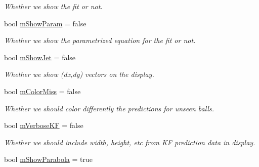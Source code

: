 \begin{DoxyCompactItemize}
\begin{DoxyCompactList}\small\item\em Whether we show the fit or not. \end{DoxyCompactList}\item 
bool \hyperlink{classProjectorWindow_a945d28c6ad25e7ef3b707a4a92c7359a}{m\+Show\+Param} = false\hypertarget{classProjectorWindow_a945d28c6ad25e7ef3b707a4a92c7359a}{}\label{classProjectorWindow_a945d28c6ad25e7ef3b707a4a92c7359a}

\begin{DoxyCompactList}\small\item\em Whether we show the parametrized equation for the fit or not. \end{DoxyCompactList}\item 
bool \hyperlink{classProjectorWindow_ada8648c5f69ce30da817aa2194912d95}{m\+Show\+Jet} = false\hypertarget{classProjectorWindow_ada8648c5f69ce30da817aa2194912d95}{}\label{classProjectorWindow_ada8648c5f69ce30da817aa2194912d95}

\begin{DoxyCompactList}\small\item\em Whether we show (dx,dy) vectors on the display. \end{DoxyCompactList}\item 
bool \hyperlink{classProjectorWindow_a7d34a61487e207c2380007f38e6e2c44}{m\+Color\+Miss} = false\hypertarget{classProjectorWindow_a7d34a61487e207c2380007f38e6e2c44}{}\label{classProjectorWindow_a7d34a61487e207c2380007f38e6e2c44}

\begin{DoxyCompactList}\small\item\em Whether we should color differently the predictions for unseen balls. \end{DoxyCompactList}\item 
bool \hyperlink{classProjectorWindow_afa70dd601f972eb8c839bc6e6c09d62d}{m\+Verbose\+KF} = false\hypertarget{classProjectorWindow_afa70dd601f972eb8c839bc6e6c09d62d}{}\label{classProjectorWindow_afa70dd601f972eb8c839bc6e6c09d62d}

\begin{DoxyCompactList}\small\item\em Whether we should include width, height, etc from KF prediction data in display. \end{DoxyCompactList}\item 
bool \hyperlink{classProjectorWindow_a1175df34d5b16a06d3ae1bc90f11accc}{m\+Show\+Parabola} = true\hypertarget{classProjectorWindow_a1175df34d5b16a06d3ae1bc90f11accc}{}\label{classProjectorWindow_a1175df34d5b16a06d3ae1bc90f11accc}


\end{DoxyCompactItemize}
